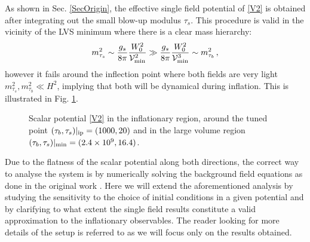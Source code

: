 \documentclass[11pt,a4paper]{article}
\newcommand{\be}{\begin{equation}}
\newcommand{\ee}{\end{equation}}
\newcommand\vo{{\mathcal{V}}}
\begin{document}
As shown in Sec. \ref{SecOrigin}, the effective single field potential of \eqref{V2} is obtained after integrating out the small blow-up modulus $\tau_s$. This procedure is valid in the vicinity of the LVS minimum where there is a clear mass hierarchy:
\be
m_{\tau_s}^2 \sim \frac{g_s}{8\pi}\frac{W_0^2}{\vo_{\rm min}^2} \gg \frac{g_s}{8\pi}\frac{W_0^2}{\vo_{\rm min}^3} \sim m_{\tau_b}^2\,,
\ee
however it fails around the inflection point where both fields are very light $m_{\tau_s}^2, m_{\tau_b}^2 \ll H^2 $, implying that both will be dynamical during inflation. This is illustrated in Fig. \ref{fig:2FieldLVS_pot}.

\begin{figure}[h!]
\centering
{} \quad
{} 
\caption{Scalar potential \eqref{V2} in the inflationary region, around the tuned point $(\tau_b,\tau_s)|_{\rm ip}=(1000,20)$ and in the large volume region $(\tau_b,\tau_s)|_{\rm min}=(2.4\times 10^9, 16.4)$.}
\label{fig:2FieldLVS_pot}
\end{figure}

Due to the flatness of the scalar potential along both directions, the correct way to analyse the system is by numerically solving the background field equations as done in the original work \cite{Conlon:2008cj}. Here we will extend the aforementioned analysis by studying the sensitivity to the choice of initial conditions in a given potential and by clarifying to what extent the single field results constitute a valid approximation to the inflationary observables. The reader looking for more details of the setup is referred to \cite{Conlon:2008cj} as we will focus only on the results obtained.
\end{document}
